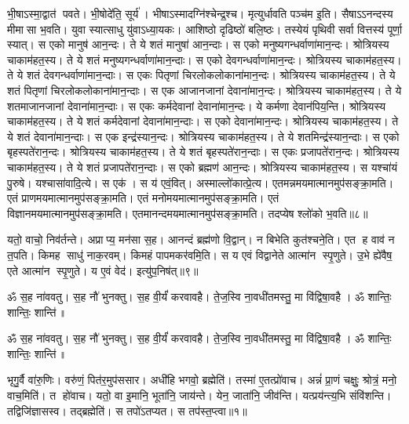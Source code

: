 भी॒षाऽस्मा॒द्वात॑ पवते। भी॒षोदे॑ति॒ सूर्य॑। भीषाऽस्मादग्नि॑श्चेन्द्र॒श्च। मृत्युर्धावति पञ्च॑म इ॒ति। सैषाऽऽनन्दस्य मीमासा भ॒वति। युवा स्यात्साधु यु॑वाऽध्या॒यकः। आशिष्ठो दृढिष्ठो॑ बलि॒ष्ठः। तस्येयं पृथिवी सर्वा वित्तस्य॑ पूर्णा॒ स्यात्। स एको मानुष॑ आन॒न्दः। ते ये शतं मानुषा॑ आन॒न्दाः। स एको मनुष्यगन्धर्वाणा॑मान॒न्दः। श्रोत्रियस्य चाकाम॑हत॒स्य। ते ये शतं मनुष्यगन्धर्वाणा॑मान॒न्दाः। स एको देवगन्धर्वाणा॑मान॒न्दः। श्रोत्रियस्य चाकाम॑हत॒स्य। ते ये शतं देवगन्धर्वाणा॑मान॒न्दाः। स एकः पितृणां चिरलोकलोकाना॑मान॒न्दः। श्रोत्रियस्य चाकाम॑हत॒स्य। ते ये शतं पितृणां चिरलोकलोकाना॑\-मान॒न्दाः। स एक आजानजानां देवाना॑मान॒न्दः। श्रोत्रियस्य चाकाम॑हत॒स्य। ते ये शतमाजानजानां देवाना॑मान॒न्दाः। स एकः कर्मदेवानां देवाना॑मान॒न्दः। ये कर्मणा देवान॑पिय॒न्ति। श्रोत्रियस्य चाकाम॑हत॒स्य। ते ये शतं कर्मदेवानां देवाना॑मान॒न्दाः। स एको देवाना॑मान॒न्दः। श्रोत्रियस्य चाकाम॑हत॒स्य। ते ये शतं देवाना॑मान॒न्दाः। स एक इन्द्र॑स्यान॒न्दः। श्रोत्रियस्य चाकाम॑हत॒स्य। ते ये शतमिन्द्र॑स्यान॒न्दाः। स एको बृहस्पते॑रान॒न्दः। श्रोत्रियस्य चाकाम॑हत॒स्य। ते ये शतं बृहस्पते॑रान॒न्दाः। स एकः प्रजापते॑रान॒न्दः। श्रोत्रियस्य चाकाम॑हत॒स्य। ते ये शतं प्रजापते॑रान॒न्दाः। स एको ब्रह्मण॑ आन॒न्दः। श्रोत्रियस्य चाकाम॑हत॒स्य। स यश्चा॑यं पु॒रुषे। यश्चासा॑वादि॒त्ये। स एक॑। स य॑ एवं॒वित्। अस्माल्लो॑कात्प्रे॒त्य। एतमन्नमयमात्मानमुप॑सङ्क्रा॒मति। एतं प्राणमयमात्मानमुप॑सङ्क्रा॒मति। एतं मनोमयमात्मानमुप॑\-सङ्क्रा॒मति। एतं विज्ञानमयमात्मानमुप॑\-सङ्क्रा॒मति। एतमानन्द\-मयमात्मानमुप॑\-सङ्क्रा॒मति। तदप्येष श्लो॑को भ॒वति॥८॥

यतो॒ वाचो॒ निव॑र्तन्ते। अप्राप्य॒ मन॑सा स॒ह। आनन्दं ब्रह्म॑णो वि॒द्वान्। न बिभेति कुत॑श्चने॒ति। एत ह वाव॑ न त॒पति। किमह साधु॑ नाक॒रवम्। किमहं पापमकर॑वमि॒ति। स य एवं  विद्वानेते आत्मा॑न स्पृ॒णुते। उ॒भे ह्ये॑वैष॒ एते आत्मा॑न स्पृ॒णुते। य ए॒वं वेद॑। इत्यु॑प॒निष॑त्॥९॥

ॐ स॒ह ना॑ववतु। स॒ह नौ॑ भुनक्तु। स॒ह वी॒र्यं॑ करवावहै। ते॒ज॒स्वि ना॒वधी॑तमस्तु॒ मा वि॑द्विषा॒वहै। ॐ शान्तिः॒ शान्तिः॒ शान्ति॑॥

\closesection
\clearpage

\setcounter{anuvakam}{0}
ॐ स॒ह ना॑ववतु। स॒ह नौ॑ भुनक्तु। स॒ह वी॒र्यं॑ करवावहै। ते॒ज॒स्वि ना॒वधी॑तमस्तु॒ मा वि॑द्विषा॒वहै। ॐ शान्तिः॒ शान्तिः॒ शान्ति॑॥


भृगु॒र्वै वा॑रु॒णिः। वरु॑णं॒ पित॑र॒मुप॑ससार। अधी॑हि भगवो॒ ब्रह्मेति॑। तस्मा॑ ए॒तत्प्रो॑वाच। अन्नं॑ प्रा॒णं चक्षुः॒ श्रोत्रं॒ मनो॒ वाच॒मिति॑। त हो॑वाच। यतो॒ वा इ॒मानि॒ भूता॑नि॒ जाय॑न्ते। येन॒ जाता॑नि॒ जीव॑न्ति। यत्प्रय॑न्त्य॒भि संवि॑शन्ति। तद्विजि॑ज्ञासस्व। तद्ब्रह्मेति॑। स तपो॑ऽतप्यत। स तप॑स्त॒प्त्वा॥१॥

